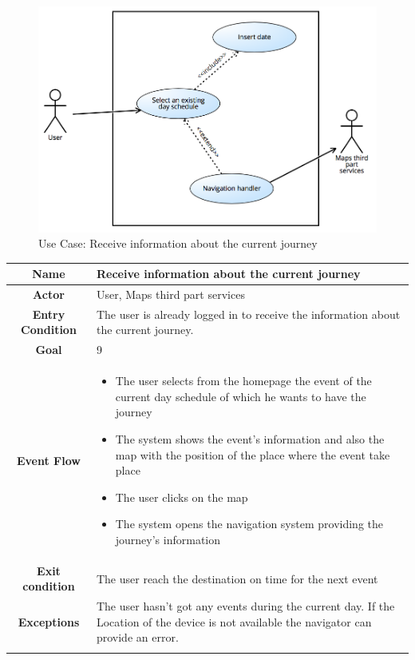 \documentclass[numbers=noenddot, 12pt, a4paper, oneside]{scrbook}
\begin{document}
\begin{figure}[H]
	\includegraphics[width=1\textwidth]{usecases/Scenario9}
	\caption{Use Case: Receive information about the current journey}
\end{figure}


\begin{tabular}{|c|p{}|}
	\hline
	\parbox[c][6ex]{6ex}{\centering \textbf{Name}} & Receive information about the current journey
	\\
	\hline
	\parbox[c][6ex]{6ex}{\centering \textbf{Actor}} & User, Maps third part services \\
	\hline
	\parbox[c][10ex]{15ex}{\centering \textbf{Entry Condition}} & The user is already logged in to receive the information about the current journey.
	\\
	\hline
	\parbox[c][6ex]{6ex}{\centering \textbf{Goal}} & 9 \\
	\hline
	\parbox[c][10ex]{12ex}{\centering \textbf{Event Flow}} & \begin{itemize}
		\item The user selects from the homepage the event of the current day schedule of which he wants to have the journey
		\item The system shows the event’s information and also the map with the position of the place where the event take place
		\item The user clicks on the map
		\item The system opens the navigation system providing the journey’s information
	\end{itemize}\\
	\hline
	\parbox[c][7ex]{12ex}{\centering \textbf{Exit condition}} & The user reach the destination on time for the next event \\\hline
	\parbox[c][10ex]{13ex}{\centering \textbf{Exceptions}} & The user hasn’t got any events during the current day. If the Location of the device is not available the navigator can provide an error.
	\\ \\ \hline	
	
	
\end{tabular}
\end{document}
